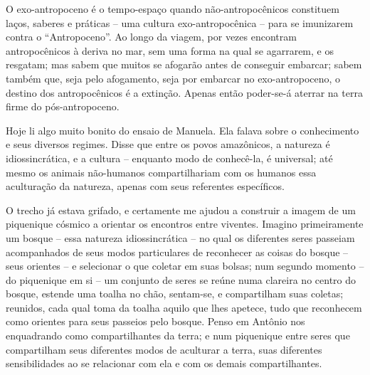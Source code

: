 O exo-antropoceno é o tempo-espaço quando não-antropocênicos constituem laços, saberes e práticas -- uma cultura exo-antropocênica -- para se imunizarem contra o \enquote{Antropoceno}. Ao longo da viagem, por vezes encontram antropocênicos à deriva no mar, sem uma forma na qual se agarrarem, e os resgatam; mas sabem que muitos se afogarão antes de conseguir embarcar; sabem também que, seja pelo afogamento, seja por embarcar no exo-antropoceno, o destino dos antropocênicos é a extinção. Apenas então poder-se-á aterrar na terra firme do pós-antropoceno.


Hoje li algo muito bonito do ensaio de Manuela. Ela falava sobre o conhecimento e seus diversos regimes. Disse que entre os povos amazônicos, a natureza é idiossincrática, e a cultura -- enquanto modo de conhecê-la, é universal; até mesmo os animais não-humanos compartilhariam com os humanos essa aculturação da natureza, apenas com seus referentes específicos.

O trecho já estava grifado, e certamente me ajudou a construir a imagem de um piquenique cósmico a orientar os encontros entre viventes. Imagino primeiramente um bosque -- essa natureza idiossincrática -- no qual os diferentes seres passeiam acompanhados de seus modos particulares de reconhecer as coisas do bosque -- seus orientes -- e selecionar o que coletar em suas bolsas; num segundo momento -- do piquenique em si -- um conjunto de seres se reúne numa clareira no centro do bosque, estende uma toalha no chão, sentam-se, e compartilham suas coletas; reunidos, cada qual toma da toalha aquilo que lhes apetece, tudo que reconhecem como orientes para seus passeios pelo bosque. Penso em Antônio nos enquadrando como compartilhantes da terra; e num piquenique entre seres que compartilham seus diferentes modos de aculturar a terra, suas diferentes sensibilidades ao se relacionar com ela e com os demais compartilhantes.

